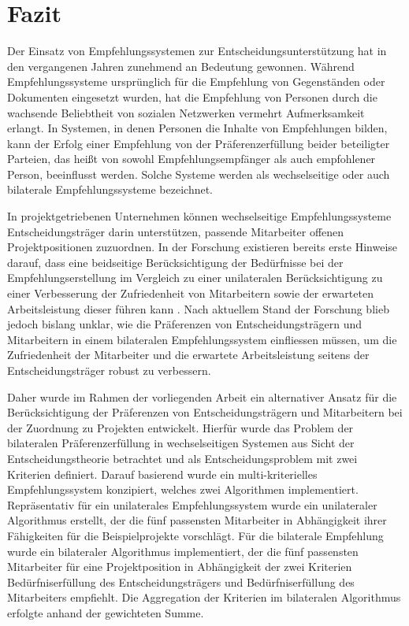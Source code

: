 
\chapter{Fazit}
\label{ch:fazit}
Der Einsatz von Empfehlungssystemen zur Entscheidungsunterstützung hat in den vergangenen Jahren zunehmend an Bedeutung gewonnen.
Während Empfehlungssysteme ursprünglich für die Empfehlung von Gegenständen oder Dokumenten eingesetzt wurden, hat die Empfehlung von Personen durch die wachsende Beliebtheit von sozialen Netzwerken vermehrt Aufmerksamkeit erlangt.
In Systemen, in denen Personen die Inhalte von Empfehlungen bilden, kann der Erfolg einer Empfehlung von der Präferenzerfüllung beider beteiligter Parteien, das heißt von sowohl Empfehlungsempfänger als auch empfohlener Person, beeinflusst werden.
Solche Systeme werden als wechselseitige oder auch bilaterale Empfehlungssysteme bezeichnet.

In projektgetriebenen Unternehmen können wechselseitige Empfehlungssysteme Entscheidungsträger darin unterstützen, passende Mitarbeiter offenen Projektpositionen zuzuordnen.
In der Forschung existieren bereits erste Hinweise darauf, dass eine beidseitige Berücksichtigung der Bedürfnisse bei der Empfehlungserstellung im Vergleich zu einer unilateralen Berücksichtigung zu einer Verbesserung der Zufriedenheit von Mitarbeitern sowie der erwarteten Arbeitsleistung dieser führen kann \cite[S. 3]{link:booklet}.
Nach aktuellem Stand der Forschung blieb jedoch bislang unklar, wie die Präferenzen von Entscheidungsträgern und Mitarbeitern in einem bilateralen Empfehlungssystem einfliessen müssen, um die Zufriedenheit der Mitarbeiter und die erwartete Arbeitsleistung seitens der Entscheidungsträger robust zu verbessern.

Daher wurde im Rahmen der vorliegenden Arbeit ein alternativer Ansatz für die Berücksichtigung der Präferenzen von Entscheidungsträgern und Mitarbeitern bei der Zuordnung zu Projekten entwickelt.
Hierfür wurde das Problem der bilateralen Präferenzerfüllung in wechselseitigen Systemen aus Sicht der Entscheidungstheorie betrachtet und als Entscheidungsproblem mit zwei Kriterien definiert.
Darauf basierend wurde ein multi-kriterielles Empfehlungssystem konzipiert, welches zwei Algorithmen implementiert.
Repräsentativ für ein unilaterales Empfehlungssystem wurde ein unilateraler Algorithmus erstellt, der die fünf passensten Mitarbeiter in Abhängigkeit ihrer Fähigkeiten für die Beispielprojekte vorschlägt.
Für die bilaterale Empfehlung wurde ein bilateraler Algorithmus implementiert, der die fünf passensten Mitarbeiter für eine Projektposition in Abhängigkeit der zwei Kriterien Bedürfniserfüllung des Entscheidungsträgers und Bedürfniserfüllung des Mitarbeiters empfiehlt.
Die Aggregation der Kriterien im bilateralen Algorithmus erfolgte anhand der gewichteten Summe.

